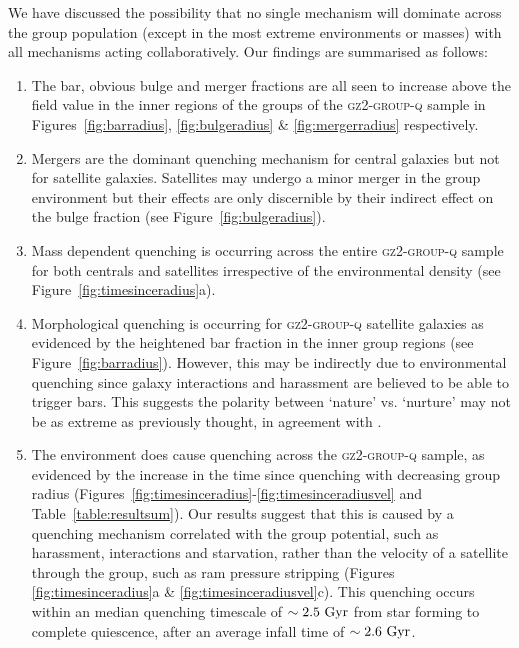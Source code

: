 \documentclass[useAMS,usenatbib]{mn2e}
\begin{document}
We have discussed the possibility that no single mechanism will dominate across the group population (except in the most extreme environments or masses) with all mechanisms acting collaboratively. Our findings are summarised as follows:
\begin{enumerate}
\item The bar, obvious bulge and merger fractions are all seen to increase above the field value in the inner regions of the groups of the \textsc{gz2-group-q} sample in Figures~\ref{fig:barradius}, \ref{fig:bulgeradius} \& \ref{fig:mergerradius} respectively.  
 
\item Mergers are the dominant quenching mechanism for central galaxies but not for satellite galaxies. Satellites may undergo a minor merger in the group environment but their effects are only discernible by their indirect effect on the bulge fraction (see Figure~\ref{fig:bulgeradius}).
 
\item Mass dependent quenching is occurring across the entire \textsc{gz2-group-q} sample for both centrals and satellites irrespective of the environmental density (see Figure~\ref{fig:timesinceradius}a).
 
\item Morphological quenching is occurring for \textsc{gz2-group-q} satellite galaxies as evidenced by the heightened bar fraction in the inner group regions (see Figure~\ref{fig:barradius}). However, this may be indirectly due to environmental quenching since galaxy interactions and harassment are believed to be able to trigger bars. This suggests the polarity between `nature' vs. `nurture' may not be as extreme as previously thought, in agreement with \cite{skibba12}. 

\item The environment does cause quenching across the \textsc{gz2-group-q} sample, as evidenced by the increase in the time since quenching with decreasing group radius (Figures~\ref{fig:timesinceradius}-\ref{fig:timesinceradiusvel} and Table~\ref{table:resultsum}). Our results suggest that this is caused by a quenching mechanism correlated with the group potential, such as harassment, interactions and starvation, rather than the velocity of a satellite through the group, such as ram pressure stripping (Figures \ref{fig:timesinceradius}a \&  \ref{fig:timesinceradiusvel}c). This quenching occurs within an median quenching timescale of $\sim2.5~\rm{Gyr}$ from star forming to complete quiescence, after an average infall time of $\sim 2.6 ~\rm{Gyr}$. 
  
\end{enumerate}
\end{document}
